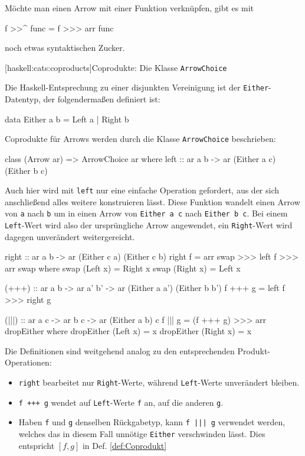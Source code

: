 \documentclass[11pt, a4paper, bibgerm]{scrbook}
\newenvironment{DIFnomarkup}{}{}
\newcommand\icode[1]{\lstinline?#1?}
\newcommand\lsubsection{}
\newcommand{\dref}[1]{Def. \ref{def:#1}}
\begin{document}
Möchte man einen Arrow mit einer Funktion verknüpfen, gibt es mit
\begin{DIFnomarkup}\begin{code}
f >>^ func = f >>> arr func
\end{code}\end{DIFnomarkup}%
noch etwas syntaktischen Zucker.

\lsubsection[haskell:cats:coproducts]{Coprodukte: Die Klasse \texttt{ArrowChoice}}

Die Haskell-Entsprechung zu einer disjunkten Vereinigung ist der
\icode{Either}-Datentyp, der folgendermaßen definiert ist:
\begin{DIFnomarkup}\begin{code}
data Either a b = Left a | Right b
\end{code}\end{DIFnomarkup}
Coprodukte für Arrows werden durch die Klasse \icode{ArrowChoice} beschrieben:
\begin{DIFnomarkup}\begin{code}
class (Arrow ar) => ArrowChoice ar where
  left :: ar a b -> ar (Either a c) (Either b c)
\end{code}\end{DIFnomarkup}
Auch hier wird mit \icode{left} nur eine einfache Operation gefordert,
aus der sich anschließend alles weitere konstruieren lässt. Diese
Funktion wandelt einen Arrow von \icode{a} nach \icode{b} um in
einen Arrow von \icode{Either a c} nach \icode{Either b c}. Bei einem
\icode{Left}-Wert wird also der ursprüngliche Arrow angewendet, ein
\icode{Right}-Wert wird dagegen unverändert weitergereicht.
\begin{DIFnomarkup}\begin{code}
  right :: ar a b -> ar (Either c a) (Either c b)
  right f = arr swap >>> left f >>> arr swap
    where swap (Left x)  = Right x
          swap (Right x) = Left x

  (+++) :: ar a b -> ar a' b' -> ar (Either a a') (Either b b')
  f +++ g = left f >>> right g

  (|||) :: ar a c -> ar b c -> ar (Either a b) c
  f ||| g = (f +++ g) >>> arr dropEither
    where dropEither (Left x)  = x
          dropEither (Right x) = x

\end{code}\end{DIFnomarkup} %
Die Definitionen sind weitgehend analog zu den entsprechenden
Produkt-Operationen:
\begin{itemize}
\item \icode{right} bearbeitet nur \icode{Right}-Werte, während
  \icode{Left}-Werte unverändert bleiben.
\item \icode{f +++ g} wendet auf \icode{Left}-Werte \icode{f} an, auf
  die anderen \icode{g}.
\item Haben \icode{f} und \icode{g} denselben Rückgabetyp, kann
  \icode{f ||| g} verwendet werden, welches das in diesem Fall unnötige
  \icode{Either} verschwinden lässt. Dies entspricht $[f,g]$ in
  \dref{Coprodukt}
\end{itemize}
\end{document}
